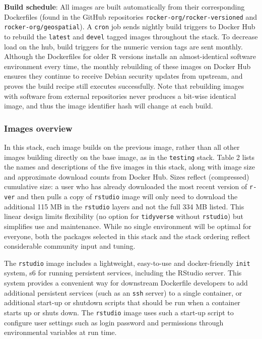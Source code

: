 \textbf{Build schedule}: All images are built automatically from their
corresponding Dockerfiles (found in the GitHub repositories
\texttt{rocker-org/rocker-versioned} and
\texttt{rocker-org/geospatial}). A \texttt{cron} job sends nightly build
triggers to Docker Hub to rebuild the \texttt{latest} and \texttt{devel}
tagged images throughout the stack. To decrease load on the hub, build
triggers for the numeric version tags are sent monthly. Although the
Dockerfiles for older R versions installs an almost-identical software
environment every time, the monthly rebuilding of these images on Docker
Hub ensures they continue to receive Debian security updates from
upstream, and proves the build recipe still executes successfully. Note
that rebuilding images with software from external repositories never
produces a bit-wise identical image, and thus the image identifier hash
will change at each build.

\subsubsection{Images overview}\label{images-overview-1}

In this stack, each image builds on the previous image, rather than all
other images building directly on the base image, as in the
\texttt{testing} stack. Table 2 lists the names and descriptions of the
five images in this stack, along with image size and approximate
download counts from Docker Hub. Sizes reflect (compressed) cumulative
size: a user who has already downloaded the most recent version of
\texttt{r-ver} and then pulls a copy of \texttt{rstudio} image will only
need to download the additional 115 MB in the \texttt{rstudio} layers
and not the full 334 MB listed. This linear design limits flexibility
(no option for \texttt{tidyverse} without \texttt{rstudio}) but
simplifies use and maintenance. While no single environment will be
optimal for everyone, both the packages selected in this stack and the
stack ordering reflect considerable community input and tuning.

The \texttt{rstudio} image includes a lightweight, easy-to-use and
docker-friendly \texttt{init} system, s6 \citep{s6} for running
persistent services, including the
RStudio\textsuperscript{\textregistered} server. This system provides a
convenient way for downstream Dockerfile developers to add additional
persistent services (such as an \texttt{ssh} server) to a single
container, or additional start-up or shutdown scripts that should be run
when a container starts up or shuts down. The \texttt{rstudio} image
uses such a start-up script to configure user settings such as login
password and permissions through environmental variables at run time.


